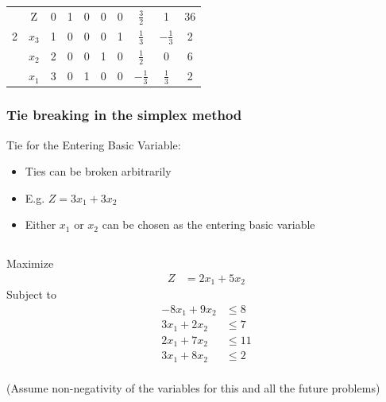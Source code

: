 \documentclass[12pt]{article}
\begin{document}
\begin{tabular}{|cc|c|c|ccccc|c|}
                           & Z         & 0                                    & 1 & 0                      & 0                       & 0     & $\frac{3}{2}$  & 1              & 36                      \\
                         2 & $x_3$     & 1                                    & 0 & 0                      & 0                       & 1     & $\frac{1}{3}$  & $-\frac{1}{3}$ & 2                       \\
                           & $x_2$     & 2                                    & 0 & 0                      & 1                       & 0     & $\frac{1}{2}$  & 0              & 6                       \\
                           & $x_1$     & 3                                    & 0 & 1                      & 0                       & 0     & $-\frac{1}{3}$ & $\frac{1}{3}$  & 2
\end{tabular}


  \subsubsection*{Tie breaking in the simplex method}
  Tie for the Entering Basic Variable:

  \begin{itemize}
  \item Ties can be broken arbitrarily
  \item E.g. $Z = 3 x_1 + 3 x_2$
  \item Either $x_1$ or $x_2$ can be chosen as the entering basic variable
  \end{itemize}

\subsection{}
Maximize
\begin{align*}
Z &= 2x_{1}+5x_{2}
\end{align*}
Subject to
\begin{align*}
-8x_{1}+9x_{2}& \le 8\\
3x_{1}+2x_{2}& \le 7\\
2x_{1}+7x_{2}& \le 11\\
3x_{1}+8x_{2}& \le 2\\
\end{align*}

(Assume non-negativity of the variables for this and all the future problems)
\end{document}
